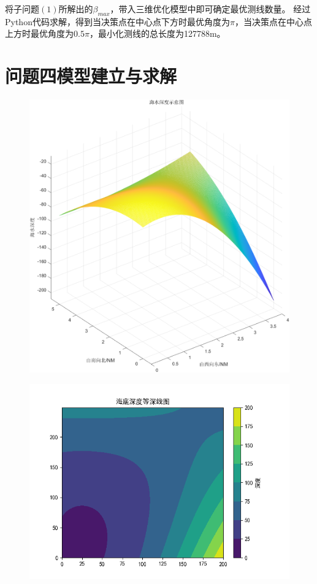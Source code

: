 \documentclass[withoutpreface,bwprint]{cumcmthesis} %
\begin{document}
    将子问题$(1)$所解出的$\beta_{max}$，带入三维优化模型中即可确定最优测线数量。
    经过Python代码求解，得到当决策点在中心点下方时最优角度为$\pi$，当决策点在中心点上方时最优角度为$0.5\pi$，最小化测线的总长度为127788m。
    \section{问题四模型建立与求解}
    \begin{figure}[htbp]
        \centering
        \begin{minipage}[c]{0.48\textwidth}
            \centering
            \includegraphics[height=0.3\textheight]{第四问1.png}
            \label{20}
        \end{minipage}
        \begin{minipage}[c]{0.48\textwidth}
            \centering
            \includegraphics[height=0.3\textheight]{第四问2.png}

\end{minipage}
\end{figure}
\end{document}
